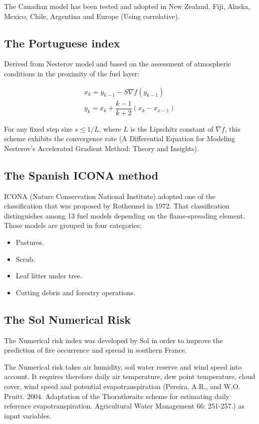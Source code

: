 {{	The Canadian model has been tested and adopted in New Zealand, Fiji, Alaska, Mexico, Chile, Argentina and Europe (Using correlative).
	
	\subsection{The Portuguese index}
		Derived from Nesterov model and based on the assessment of atmospheric conditions in the proximity of the fuel layer:
		
	\begin{equation}
		\begin{aligned}
			x_{k} = y_{k-1} - S\nabla f(y_{k-1})\\
			y_{k} = x_{k} + \dfrac{k-1}{k+2}(x_{k} - x_{x-1})
		\end{aligned}
	\end{equation}

	For any fixed step size $s \le 1/L$, where $L$ is the Lipschitz constant of $\nabla f$, this scheme exhibits the convergence rate (A Differential Equation for Modeling Nesterov’s Accelerated Gradient Method: Theory and Insights).
	
	\subsection{The Spanish ICONA method}
	
	ICONA (Nature Conservation National Institute) adopted one of the classification that was proposed by Rothermel in 1972. That classification distinguishes among 13 fuel models depending on the flame-spreading element. Those models are grouped in four categories:
	
	\begin{itemize}
		\item Pastures.
		\item Scrub.
		\item Leaf litter under tree.
		\item Cutting debris and forestry operations.
	\end{itemize}
	
	\subsection{The Sol Numerical Risk}
	
	The Numerical risk index was developed by Sol in order to improve the prediction of fire occurrence and spread in southern France.
	
	The Numerical risk takes air humidity, soil water reserve and wind speed into account. It requires therefore daily air temperature, dew point temperature, cloud cover, wind speed and potential evapotranspiration (Pereira, A.R., and W.O. Pruitt. 2004. Adaptation of the Thornthwaite scheme for estimating daily reference evapotranspiration. Agricultural Water Management 66: 251-257.) as input variables.
	
}}
